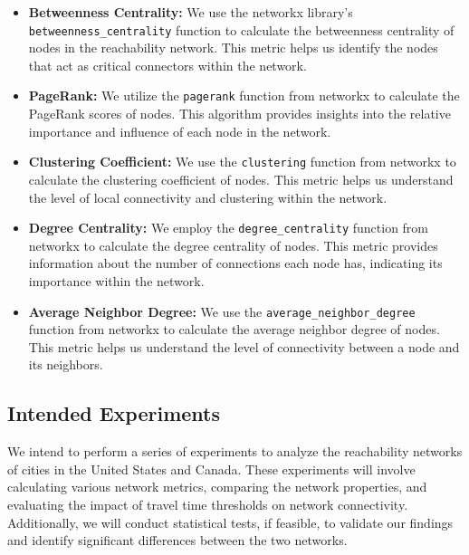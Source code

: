 \begin{itemize}
  \item \textbf{Betweenness Centrality:} We use the networkx library's \texttt{betweenness\_centrality} function to calculate the betweenness centrality of nodes in the reachability network. This metric helps us identify the nodes that act as critical connectors within the network.

  \item \textbf{PageRank:} We utilize the \texttt{pagerank} function from networkx to calculate the PageRank scores of nodes. This algorithm provides insights into the relative importance and influence of each node in the network.

  \item \textbf{Clustering Coefficient:} We use the \texttt{clustering} function from networkx to calculate the clustering coefficient of nodes. This metric helps us understand the level of local connectivity and clustering within the network.

  \item \textbf{Degree Centrality:} We employ the \texttt{degree\_centrality} function from networkx to calculate the degree centrality of nodes. This metric provides information about the number of connections each node has, indicating its importance within the network.

  \item \textbf{Average Neighbor Degree:} We use the \texttt{average\_neighbor\_degree} function from networkx to calculate the average neighbor degree of nodes. This metric helps us understand the level of connectivity between a node and its neighbors.
\end{itemize}




\subsection{Intended Experiments}

We intend to perform a series of experiments to analyze the reachability networks of cities in the United States and Canada. These experiments will involve calculating various network metrics, comparing the network properties, and evaluating the impact of travel time thresholds on network connectivity. Additionally, we will conduct statistical tests, if feasible, to validate our findings and identify significant differences between the two networks.
